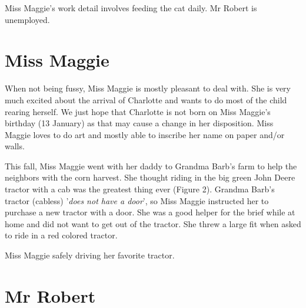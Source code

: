 \documentclass{article}
\makeatletter
\newenvironment{figurehere}
  {\def\@captype{figure}}
  {}
\makeatother
\begin{document}
\begin{multicols}{2}
Miss Maggie's work detail involves feeding the cat daily.  Mr Robert is
unemployed.

\section{Miss Maggie}

When not being fussy, Miss Maggie is mostly pleasant to deal with.  She is very
much excited about the arrival of Charlotte and wants to do most of the child
rearing herself. We just hope that Charlotte is not born on Miss Maggie's
birthday (13 January) as that may cause a change in her disposition.  Miss
Maggie loves to do art and mostly able to inscribe her name on paper and/or walls.

This fall, Miss Maggie went with her daddy to Grandma Barb's farm to help the
neighbors with the corn harvest.  She thought riding in the big green John Deere
tractor with a cab was the greatest thing ever (Figure 2).  Grandma Barb's
tractor (cabless) '\textit{does not have a door}', so Miss Maggie instructed her
to purchase a new tractor with a door.  She was a good helper for the brief
while at home and did not want to get out of the tractor. She threw a large fit
when asked to ride in a red colored tractor.

\bigskip

\begin{figurehere}
 \centering   
 \caption{Miss Maggie safely driving her favorite tractor.}
\end{figurehere}

\section{Mr Robert}


\end{multicols}
\end{document}

